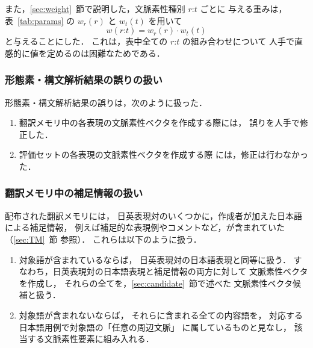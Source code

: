 また，\ref{sec:weight}~節で説明した，文脈素性種別 $r$:$t$ ごとに
与える重みは，表~\ref{tab:params} の $w_r(r)$ と $w_t(t)$ を用いて
\[
 w(\mbox{$r$:$t$}) = w_r(r)\cdot w_t(t)
\]
と与えることにした．
これは，表中全ての $r$:$t$ の組み合わせについて
人手で直感的に値を定めるのは困難なためである．


\subsubsection{形態素・構文解析結果の誤りの扱い}
\label{sec:error_correct}
形態素・構文解析結果の誤りは，次のように扱った．

\newpage
\begin{enumerate}
 \item 翻訳メモリ中の各表現の文脈素性ベクタを作成する際には，
       誤りを人手で修正した．
 \item 評価セットの各表現の文脈素性ベクタを作成する際\footnotemark
       には，修正は行わなかった．
\end{enumerate}

\addtocounter{footnote}{-2}
\addtocounter{footnote}{1}
\addtocounter{footnote}{1}

\subsubsection{翻訳メモリ中の補足情報の扱い}
配布された翻訳メモリには，
日英表現対のいくつかに，作成者が加えた日本語による補足情報，
例えば補足的な表現例やコメントなど，が含まれていた（\ref{sec:TM}~節
参照）．
これらは以下のように扱う．

\begin{enumerate}
 \item \label{enum:add_expr}
       対象語が含まれているならば，
       日英表現対の日本語表現と同等に扱う．
       すなわち，日英表現対の日本語表現と補足情報の両方に対して
       文脈素性ベクタを作成し，
       それらの全てを，\ref{sec:candidate}~節で述べた
       文脈素性ベクタ候補と扱う．
 \item \label{enum:add_context}
       対象語が含まれないならば，
       それらに含まれる全ての内容語を，
       対応する日本語用例で対象語の「任意の周辺文脈」
       に属しているものと見なし，
       該当する文脈素性要素に組み入れる．
\end{enumerate}

